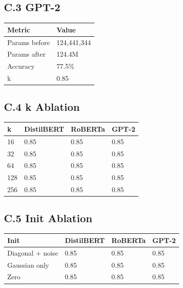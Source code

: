 \subsection{C.3 GPT-2}

\begin{table}[H]
\centering
\small
\begin{tabular}{ll}
\toprule
\textbf{Metric} & \textbf{Value} \\
\midrule
Params before & 124,441,344 \\
Params after & 124.4M \\
Accuracy & 77.5\% \\
k & 0.85 \\
\bottomrule
\end{tabular}
\end{table}

\subsection{C.4 k Ablation}

\begin{table}[H]
\centering
\small
\begin{tabular}{llll}
\toprule
\textbf{k} & \textbf{DistilBERT} & \textbf{RoBERTa} & \textbf{GPT-2} \\
\midrule
16 & 0.85 & 0.85 & 0.85 \\
32 & 0.85 & 0.85 & 0.85 \\
64 & 0.85 & 0.85 & 0.85 \\
128 & 0.85 & 0.85 & 0.85 \\
256 & 0.85 & 0.85 & 0.85 \\
\bottomrule
\end{tabular}
\end{table}

\subsection{C.5 Init Ablation}

\begin{table}[H]
\centering
\small
\begin{tabular}{llll}
\toprule
\textbf{Init} & \textbf{DistilBERT} & \textbf{RoBERTa} & \textbf{GPT-2} \\
\midrule
Diagonal + noise & 0.85 & 0.85 & 0.85 \\
Gaussian only & 0.85 & 0.85 & 0.85 \\
Zero & 0.85 & 0.85 & 0.85 \\
\bottomrule
\end{tabular}
\end{table}

